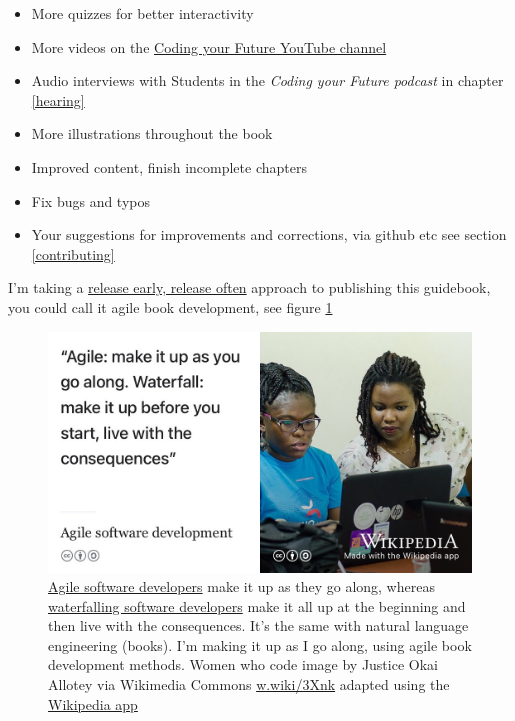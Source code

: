 \documentclass[
]{book}
\providecommand{\tightlist}{%
  \setlength{\itemsep}{0pt}\setlength{\parskip}{0pt}}
\begin{document}
\begin{itemize}
\tightlist
\item
  More quizzes for better interactivity
\item
  More videos on the \href{https://www.youtube.com/channel/UCLBv_u8JmyUPqmRALIjVnLg}{Coding your Future YouTube channel}
\item
  Audio interviews with Students in the \emph{Coding your Future podcast} in chapter \ref{hearing}
\item
  More illustrations throughout the book
\item
  Improved content, finish incomplete chapters
\item
  Fix bugs and typos
\item
  Your suggestions for improvements and corrections, via github etc see section \ref{contributing}
\end{itemize}

I'm taking a \href{https://en.wikipedia.org/wiki/Release_early,_release_often}{release early, release often} \citep{Raymond1999} approach to publishing this guidebook, you could call it agile book development, see figure \ref{fig:agile-vs-waterfall-fig} \citep{realagile}

\begin{figure}

{\centering \includegraphics[width=1\linewidth]{images/agile-vs-waterfall} 

}

\caption{\href{https://en.wikipedia.org/wiki/Agile_software_development}{Agile software developers} make it up as they go along, whereas \href{https://en.wikipedia.org/wiki/Waterfall_model}{waterfalling software developers} make it all up at the beginning and then live with the consequences. It's the same with natural language engineering (books). I'm making it up as I go along, using agile book development methods. Women who code image by Justice Okai Allotey via Wikimedia Commons \href{https://w.wiki/3Xnk}{w.wiki/3Xnk} adapted using the \href{https://apps.apple.com/us/app/wikipedia/id324715238}{Wikipedia app}}\label{fig:agile-vs-waterfall-fig}
\end{figure}
\end{document}
